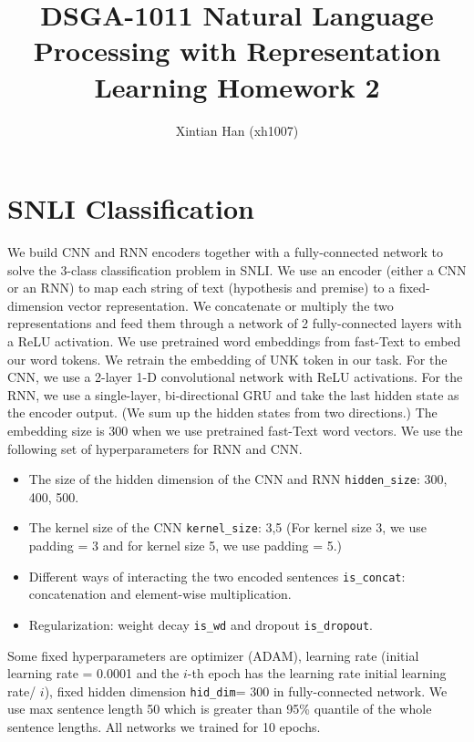 \documentclass[10pt,a4paper]{article}
\title{DSGA-1011 Natural Language Processing with Representation Learning Homework 2
}
\author{Xintian Han (xh1007)}
\begin{document}
\maketitle
\section{SNLI Classification} 
We build CNN and RNN encoders together with a fully-connected network to solve the 3-class classification problem in SNLI. We use an encoder (either a CNN or an RNN) to map each string of text (hypothesis and premise) to a fixed-dimension vector representation. We concatenate or multiply the two representations and feed them through a network of 2 fully-connected layers with a ReLU activation. We use pretrained word embeddings from fast-Text to embed our word tokens. We retrain the embedding of UNK token in our task. For the CNN, we use a 2-layer 1-D convolutional network with ReLU activations. For the RNN, we use a single-layer, bi-directional GRU and take the last hidden state as the encoder output. (We sum up the hidden states from two directions.) The embedding size is 300 when we use pretrained fast-Text word vectors. We use the following set of hyperparameters for RNN and CNN.
\begin{itemize}
\item The size of the hidden dimension of the CNN and RNN \texttt{hidden\_size}: 300, 400, 500.
\item The kernel size of the CNN \texttt{kernel\_size}: 3,5 (For kernel size 3, we use padding = 3 and for kernel size 5, we use padding = 5.)
\item Different ways of interacting the two encoded sentences \texttt{is\_concat}: concatenation and element-wise multiplication.
\item Regularization: weight decay \texttt{is\_wd} and dropout \texttt{is\_dropout}.
\end{itemize}
Some fixed hyperparameters are optimizer (ADAM), learning rate (initial learning rate = 0.0001 and the $i$-th epoch has the learning rate initial learning rate/ $i$), fixed hidden dimension \texttt{hid\_dim}= 300 in fully-connected network. We use max sentence length 50 which is greater than 95\% quantile of the whole sentence lengths. All networks we trained for 10 epochs.
\end{document}
